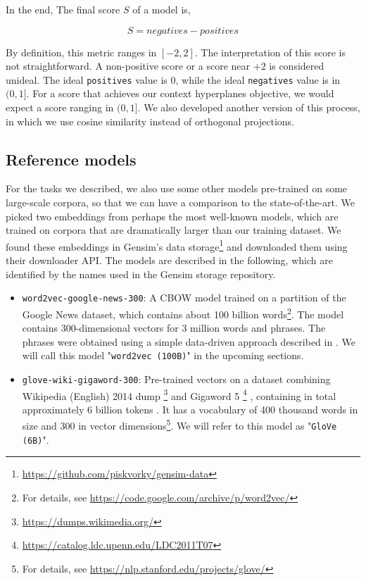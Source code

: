 In the end,  The final score $S$ of a model is,

\[
S = negatives - positives
\]

By definition, this metric ranges in $[-2, 2]$. The interpretation of this score is not straightforward. A non-positive score or a score near $+2$ is considered unideal. The ideal \verb|positives| value is $0$, while the ideal \verb|negatives| value is in $(0, 1]$. For a score that achieves our context hyperplanes objective, we would expect a score ranging in $(0, 1]$. We also developed another version of this process, in which we use cosine similarity instead of orthogonal projections.

\subsection{Reference models}
For the tasks we described, we also use some other models pre-trained on some large-scale corpora, so that we can have a comparison to the state-of-the-art. We picked two embeddings from perhaps the most well-known models, which are trained on corpora that are dramatically larger than our training dataset. We found these embeddings in Gensim's data storage\footnote{\url{https://github.com/piskvorky/gensim-data}} and downloaded them using their downloader \ac{API}. The models are described in the following, which are identified by the names used in the Gensim storage repository.

\begin{itemize}
    \item \verb|word2vec-google-news-300|: A \ac{CBOW} model trained on a partition of the Google News dataset, which contains about 100 billion words\footnote{For details, see \url{https://code.google.com/archive/p/word2vec/}}. The model contains 300-dimensional vectors for 3 million words and phrases. The phrases were obtained using a simple data-driven approach described in \cite{w2v2}. We will call this model "\verb|word2vec (100B)|" in the upcoming sections.
    \item \verb|glove-wiki-gigaword-300|: Pre-trained vectors on a dataset combining Wikipedia (English) 2014 dump \footnote{\url{https://dumps.wikimedia.org/}}  and Gigaword 5 \footnote{\url{https://catalog.ldc.upenn.edu/LDC2011T07}} \cite{gigaword}, containing in total approximately 6 billion tokens \cite{glove}. It has a vocabulary of 400 thousand words in size and 300 in vector dimensions\footnote{For details, see \url{https://nlp.stanford.edu/projects/glove/}}. We will refer to this model as "\verb|GloVe (6B)|".
\end{itemize}


